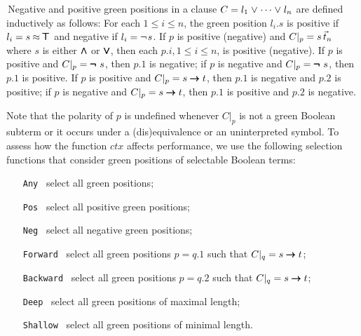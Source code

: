\documentclass[smallcondensed,draft]{svjour3}     %
\begin{document}
\begin{defi}
 \,Negative and positive green positions in a clause $C = l_1 \mathrel\lor \cdots \mathrel\lor
 l_n$ are defined inductively as follows: For each
 $1 \leq i \leq n$, the green position $l_i.s$ is positive if $l_i = s \mathbin{\approx} \pmb\top$ and negative if $l_i
 = \neg{\kern.2ex s}$. If $p$ is positive (negative) and $C|_p = s \,
 \vec{t}_{n}$ where $s$ is either $\pmb\land$ or $\pmb\lor$, then each
 $p.i, 1 \leq i \leq n$, is positive (negative). If $p$ is positive and $C|_p =
 \pmb{\neg\,} \, s$, then $p.1$ is negative; if $p$ is negative and $C|_p = \pmb{\neg\,} \, s$,
 then $p.1$ is positive. If $p$ is positive and $C|_p = s \pmb\rightarrow t$, then
 $p.1$ is negative and $p.2$ is positive; if $p$ is negative and $C|_p = s
 \pmb\rightarrow t$, then $p.1$ is positive and $p.2$ is negative.
\end{defi}
Note that the polarity of $p$ is undefined whenever $C|_p$ is not a green Boolean subterm
or it occurs under a (dis)equivalence or an uninterpreted symbol.
To assess how the function $\mathit{ctx}$ affects performance, we use the following
selection functions that consider green positions of selectable Boolean terms:
%
\begin{enumerate}
  \item[\rm\texttt{Any}~] select all green positions;
  \item[\rm\texttt{Pos}~] select all positive green positions;
  \item[\rm\texttt{Neg}~] select all negative green positions;
  \item[\rm\texttt{Forward}~] select all green positions $p = q.1$ such that $C|_q = s \pmb\rightarrow t$;
  \item[\rm\texttt{Backward}~] select all green positions $p = q.2$ such that $C|_q = s \pmb\rightarrow t$;
  \item[\rm\texttt{Deep}~] select all green positions of maximal length;
  \item[\rm\texttt{Shallow}~] select all green positions of minimal length.
\end{enumerate}
\end{document}
